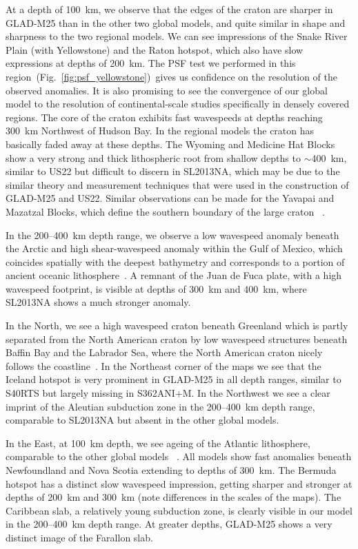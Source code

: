 \documentclass[extra,mreferee]{gji}
\begin{document}
At a depth of 100~km, we observe that the edges of the craton are sharper in
GLAD-M25 than in the other two global models,
and quite similar in shape and sharpness to the two regional models.
We can see impressions of the Snake River Plain (with Yellowstone)
and the Raton hotspot, which also have slow expressions at depths of 200~km. The PSF test we performed in this region~(Fig.~\ref{fig:psf_yellowstone})~gives us confidence on the resolution of the observed anomalies. It is also promising to see the convergence of our global model to the resolution of continental-scale studies specifically in densely covered regions.
The core of the craton exhibits fast wavespeeds at depths reaching 300~km Northwest of
Hudson Bay.
In the regional models the craton has basically faded away at these depths.
The Wyoming and Medicine Hat Blocks show a very strong and thick lithospheric
root from shallow depths to $\sim$400~km, similar to US22 but
difficult to discern in SL2013NA, which may be due to the similar theory and measurement techniques that were used in the construction of GLAD-M25 and US22.
Similar observations can be made for the Yavapai and
Mazatzal Blocks, which define the southern boundary of the large craton
~\citep{schaeffer2014imaging}.

In the 200--400~km depth range, we observe a low wavespeed anomaly beneath the Arctic
and high shear-wavespeed
anomaly within the Gulf of Mexico, which coincides spatially with the deepest
bathymetry and corresponds to a portion of ancient oceanic
lithosphere~\citep{muller2008, schaeffer2014imaging}.
A remnant of the Juan de Fuca plate,
with a high wavespeed footprint, is visible at depths of 300~km and 400~km,
where SL2013NA shows a much stronger anomaly.

In the North, we see a high wavespeed craton beneath Greenland which is partly
separated from the North American craton by low wavespeed structures beneath
Baffin Bay and the Labrador Sea, where the North American craton nicely follows
the coastline~\citep{chalmers2001development}.
In the Northeast corner of the maps we see that the Iceland hotspot is very
prominent in GLAD-M25 in all depth ranges, similar to S40RTS but largely missing
in S362ANI$+$M. In the Northwest we see a clear imprint of the Aleutian
subduction zone in the 200--400~km depth range, comparable to SL2013NA but absent
in the other global models.

In the East, at 100~km depth,
we see ageing of the Atlantic lithosphere, comparable to the other global models
~\citep{muller2008, schaeffer2014imaging}.
All models show fast anomalies beneath Newfoundland and Nova Scotia extending to
depths of 300~km.
The Bermuda hotspot has a distinct slow wavespeed impression,
getting sharper and stronger at depths of 200~km and 300~km (note differences in
the scales of the maps).
The Caribbean slab, a relatively young subduction zone, is clearly
visible in our model in the 200--400~km depth range.
At greater depths,
GLAD-M25 shows a very distinct image of the Farallon slab.
\end{document}
